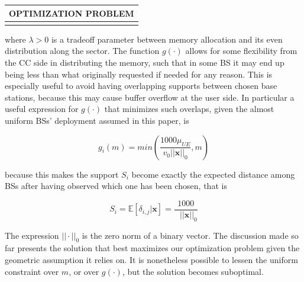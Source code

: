 \documentclass[conference,10pt]{IEEEtran}
\begin{document}
\begin{center}
	\begin{tabular}[h]{|c|}
		
		\hline
		OPTIMIZATION PROBLEM \\
		\hline
		\makebox[8.6cm]{
			$			
			\begin{array}{l l l l l l}
				\null \\
				\mathbf{x} \in \underset{\mathbf{x} \in \{0,1\}^N}{argmax} {\textrm{ } \sum_i{g_i(m)x_ie^{-\frac{(\mathbf{S}^T\mathbf{x} - 1000)^2}{2}}} - \lambda\left(\frac{\mathbf{d}^T\mathbf{x}}{2} - 1000\right)^2} \\[3ex]
				\textrm{such that:}\\[0.5ex]	
				\sum_i{g_i(m)x_i} \le F\\[0.5ex]		
				0  < g_i(m) \le min(m, \Omega) \textrm{ } \forall i \textrm{ s.t. } x_i  = 1 \textrm{,   0 otherwise}
				\null \\[2ex]
			\end{array}
			$
		}\\
		\hline
	\end{tabular}
\end{center}

where $\lambda > 0$ is a tradeoff parameter between memory allocation and its even distribution along the sector. The function $g(\cdot)$ allows for some flexibility from the CC side in distributing the memory, such that in some BS it may end up being less than what originally requested if needed for any reason. This is especially useful to avoid having overlapping supports between chosen base stations, because this may cause buffer overflow at the user side. In particular a useful expression for $g(\cdot)$ that minimizes such overlaps, given the almost uniform BSs' deployment assumed in this paper, is 

\begin{equation}
g_i(m) = min\left(\frac{1000\mu_{U\!E}}{v_0 ||\mathbf{x}||_0}, m\right)
\end{equation} 

because this makes the support $S_i$ become exactly the expected distance among BSs after having observed which one has been chosen, that is

\begin{equation}
S_i = \mathbb{E}{[\delta_{i, j}| \mathbf{x}]} =  \frac{1000}{\textrm{ }||\mathbf{x}||_0}
\end{equation} 

The expression $||\cdot||_0$ is the zero norm of a binary vector. The discussion made so far presents the solution that best maximizes our optimization problem given the geometric assumption it relies on. It is nonetheless possible to lessen the uniform constraint over $m$, or over $g(\cdot)$, but the solution becomes suboptimal. 
\end{document}
